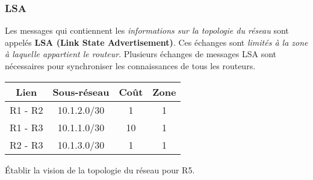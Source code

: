 \documentclass[a4paper,11pt]{article}
\begin{document}
\subsubsection{LSA}
Les messages qui contiennent les \emph{informations sur la topologie du réseau} sont appelés \textbf{LSA (Link State Advertisement)}. Ces échanges sont \emph{limités à la zone à laquelle appartient le routeur}. Plusieurs échanges de messages LSA sont nécessaires pour synchroniser les connaissances de tous les routeurs.
\begin{center}
    \begin{tabular}{|*{4}{c|}}
        \hline
        Lien & Sous-réseau & Coût & Zone \\
        \hline
        R1 - R2 & 10.1.2.0/30 & 1 & 1 \\
        \hline
        R1 - R3 & 10.1.1.0/30 & 10 & 1 \\
        \hline
        R2 - R3 & 10.1.3.0/30 & 1 & 1 \\
        \hline
    \end{tabular}
\end{center}
\begin{activite}
Établir la vision de la topologie du réseau pour R5.
\end{activite}
\end{document}
